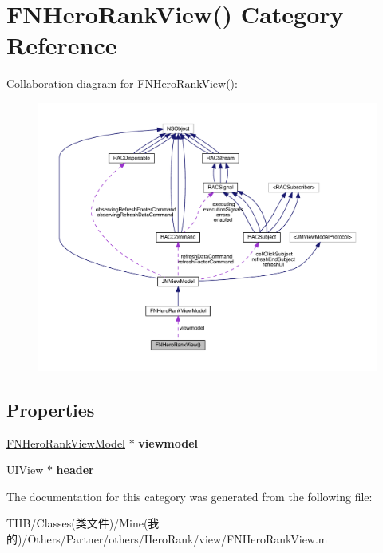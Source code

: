\hypertarget{category_f_n_hero_rank_view_07_08}{}\section{F\+N\+Hero\+Rank\+View() Category Reference}
\label{category_f_n_hero_rank_view_07_08}


Collaboration diagram for F\+N\+Hero\+Rank\+View()\+:\nopagebreak
\begin{figure}[H]
\begin{center}
\leavevmode
\includegraphics[width=350pt]{category_f_n_hero_rank_view_07_08__coll__graph}
\end{center}
\end{figure}
\subsection*{Properties}
\begin{DoxyCompactItemize}
\item 
\mbox{\label{category_f_n_hero_rank_view_07_08_abbcce7114b99d5d74f24759278d31899}} 
\mbox{\hyperlink{interface_f_n_hero_rank_view_model}{F\+N\+Hero\+Rank\+View\+Model}} $\ast$ {\bfseries viewmodel}
\item 
\mbox{\label{category_f_n_hero_rank_view_07_08_a64ffca337c98f4077ba506c8fc70a84d}} 
U\+I\+View $\ast$ {\bfseries header}
\end{DoxyCompactItemize}


The documentation for this category was generated from the following file\+:\begin{DoxyCompactItemize}
\item 
T\+H\+B/\+Classes(类文件)/\+Mine(我的)/\+Others/\+Partner/others/\+Hero\+Rank/view/F\+N\+Hero\+Rank\+View.\+m\end{DoxyCompactItemize}
